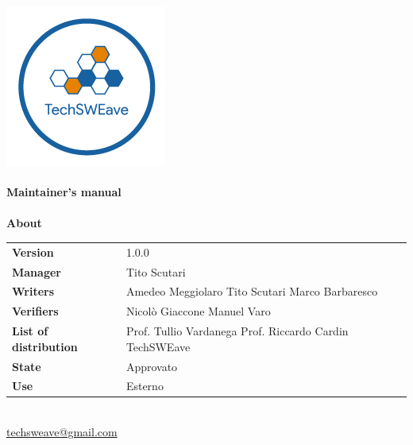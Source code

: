 \documentclass[a4paper]{article}
\begin{document}
\begin{titlepage}
    \begin{center}
        \includegraphics{../../../../Images/logo.png}\\
        \vspace{20px}
        \textcolor{logo}{\hrulefill}\\
        \vspace{20px}
        \textbf{\huge\textcolor{logo}{Maintainer's manual}}\\
        \vspace{10px}
        \textcolor{logo}{\hrulefill}\\
        \vspace{40px}
        \textbf{\Large About}\\
        \vspace{20px}
        \begin{tabular}{p{100px} | p{100px}}
            \textbf{Version}              & 1.0.0                                                                     \\
            \textbf{Manager}              & Tito Scutari                                                              \\
            \textbf{Writers}              & Amedeo Meggiolaro \newline Tito Scutari \newline Marco Barbaresco         \\
            \textbf{Verifiers}            & Nicolò Giaccone \newline Manuel Varo                                      \\
            \textbf{List of distribution} & Prof. Tullio Vardanega \newline Prof. Riccardo Cardin \newline TechSWEave \\
            \textbf{State}                & Approvato                                                                 \\
            \textbf{Use}                  & Esterno                                                                   \\
        \end{tabular}\\
        \vspace{60px}
        \href{mailto:techsweave@gmail.com}{techsweave@gmail.com}\\

    \end{center}
\end{titlepage}
\end{document}
